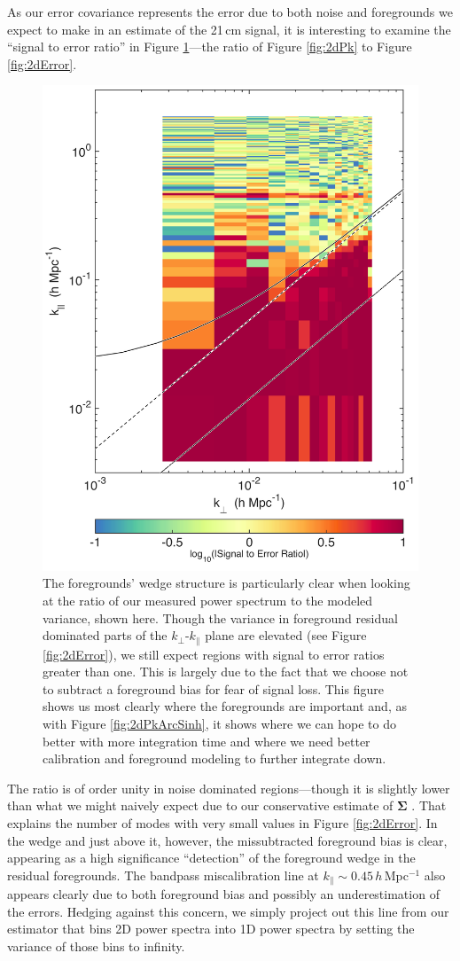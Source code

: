 As our error covariance represents the error due to both noise and foregrounds we expect to make in an estimate of the 21\,cm signal, it is interesting to examine the ``signal to error ratio'' in Figure \ref{fig:2dSNR}---the ratio of Figure \ref{fig:2dPk} to Figure \ref{fig:2dError}.
\begin{figure}[] 
	\centering 
	\includegraphics[width=.48\textwidth]{chap4_empirical_covariance/2dSNR.png}
	\caption[The foreground wedge is clear in the ratio of our measured power spectrum to the modeled variance]{The foregrounds' wedge structure is particularly clear when looking at the ratio of our measured power spectrum to the modeled variance, shown here. Though the variance in foreground residual dominated parts of the $k_\perp$-$k_\|$ plane are elevated (see Figure \ref{fig:2dError}), we still expect regions with signal to error ratios greater than one. This is largely due to the fact that we choose not to subtract a foreground bias for fear of signal loss. This figure shows us most clearly where the foregrounds are important and, as with Figure \ref{fig:2dPkArcSinh}, it shows where we can hope to do better with more integration time and where we need better calibration and foreground modeling to further integrate down.}
	\label{fig:2dSNR}
\end{figure}
The ratio is of order unity in noise dominated regions---though it is slightly lower than what we might naively expect due to our conservative estimate of $\boldsymbol\Sigma$ \cite{X13}. That explains the number of modes with very small values in Figure \ref{fig:2dError}. In the wedge and just above it, however, the missubtracted foreground bias is clear, appearing as a high significance ``detection'' of the foreground wedge in the residual foregrounds. The bandpass miscalibration line at $k_\| \sim 0.45$\,$h$\,Mpc$^{-1}$ also appears clearly due to both foreground bias and possibly an underestimation of the errors. Hedging against this concern, we simply project out this line from our estimator that bins 2D power spectra into 1D power spectra by setting the variance of those bins to infinity.


